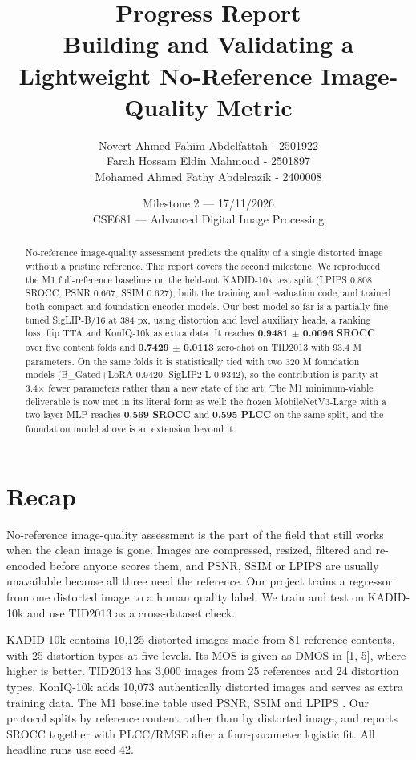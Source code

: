 \documentclass[11pt]{article}
\title{\LARGE Progress Report \\[4pt]
\large Building and Validating a Lightweight No-Reference Image-Quality Metric}
\author{
  Novert Ahmed Fahim Abdelfattah - 2501922 \\
  Farah Hossam Eldin Mahmoud - 2501897 \\
  Mohamed Ahmed Fathy Abdelrazik - 2400008
}
\date{Milestone 2 --- 17/11/2026 \\{} CSE681 --- Advanced Digital Image Processing}
\begin{document}
\maketitle

\begin{abstract}
No-reference image-quality assessment predicts the quality of a single distorted image
without a pristine reference. This report covers the second milestone. We reproduced the
M1 full-reference baselines on the held-out KADID-10k test split (LPIPS 0.808 SROCC,
PSNR 0.667, SSIM 0.627), built the training and evaluation code, and trained both compact
and foundation-encoder models. Our best model so far is a partially fine-tuned
SigLIP-B/16 at 384 px, using distortion and level auxiliary heads, a ranking loss, flip
TTA and KonIQ-10k as extra data. It reaches \textbf{0.9481 $\pm$ 0.0096 SROCC} over five
content folds and \textbf{0.7429 $\pm$ 0.0113} zero-shot on TID2013 with 93.4 M
parameters. On the same folds it is statistically tied with two 320 M foundation models
(B\_Gated+LoRA 0.9420, SigLIP2-L 0.9342), so the contribution is parity at
3.4$\times$ fewer parameters rather than a new state of the art. The M1
minimum-viable deliverable is now met in its literal form as well: the
frozen MobileNetV3-Large with a two-layer MLP reaches \textbf{0.569 SROCC} and
\textbf{0.595 PLCC} on the same split, and the foundation model above is an extension
beyond it.
\end{abstract}

\section{Recap}
\label{sec:recap}

No-reference image-quality assessment is the part of the field that still works when the
clean image is gone. Images are compressed, resized, filtered and re-encoded before
anyone scores them, and PSNR, SSIM or LPIPS are usually unavailable because all three
need the reference. Our project trains a regressor from one distorted image to a human
quality label. We train and test on KADID-10k \citep{lin2019kadid} and use TID2013
\citep{ponomarenko2015tid2013} as a cross-dataset check.

KADID-10k contains 10,125 distorted images made from 81 reference contents, with 25
distortion types at five levels. Its MOS is given as DMOS in [1, 5], where higher is
better. TID2013 has 3,000 images from 25 references and 24 distortion types.
KonIQ-10k \citep{hosu2020koniq} adds 10,073 authentically distorted images and serves as
extra training data. The M1 baseline table used PSNR, SSIM and LPIPS
\citep{zhang2018lpips}. Our protocol splits by reference content rather than by distorted
image, and reports SROCC together with PLCC/RMSE after a four-parameter logistic fit.
All headline runs use seed 42.
\end{document}

